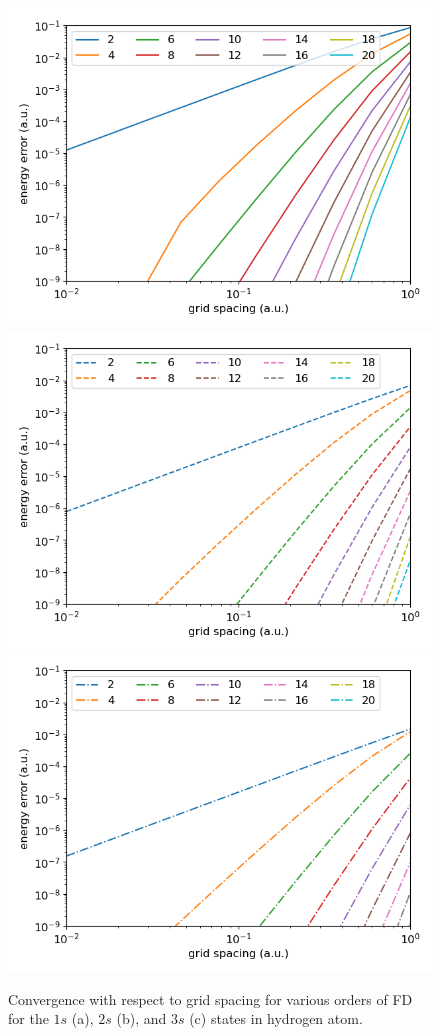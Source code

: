 \begin{figure}[h!]
\centering
\includegraphics[width=0.32\columnwidth]{figs/1s_conv.png}
\includegraphics[width=0.32\columnwidth]{figs/2s_conv.png}
\includegraphics[width=0.32\columnwidth]{figs/3s_conv.png}
\caption{\label{fig:order_convergence} Convergence with respect to grid spacing for various orders of FD for the $1s$ (a), $2s$ (b), and $3s$ (c) states in hydrogen atom.
}
\end{figure}

